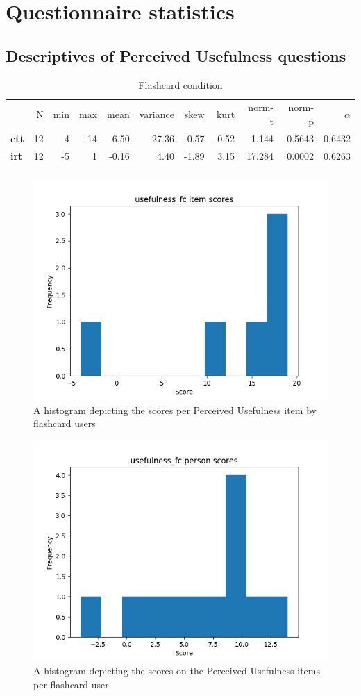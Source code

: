 \chapter{Questionnaire statistics}

\FloatBarrier
\section{Descriptives of Perceived Usefulness questions}

\begin{longtable}[c]{@{}lrrrrrrrrrr@{}}
\caption{Flashcard condition}
\endfirsthead
\endhead
\toprule\addlinespace
& N & min & max & mean & variance & skew & kurt & norm-t &
norm-p & $\alpha$
\\\addlinespace
\midrule
\textbf{ctt} & 12 & -4 & 14 & 6.50 & 27.36 & -0.57 & -0.52 & 1.144 &
0.5643 & 0.6432
\\\addlinespace
\textbf{irt} & 12 & -5 & 1 & -0.16 & 4.40 & -1.89 & 3.15 & 17.284 &
0.0002 & 0.6263
\\\addlinespace
\bottomrule
    \label{tab:usefulness_fc}
\end{longtable}

\begin{figure}
    \centering
    \includegraphics[width=.7\textwidth]{img/usefulness_fc_diff.png}
    \caption{A histogram depicting the scores per Perceived Usefulness item by flashcard users}
    \label{fig:usefulness_fc_diff}
\end{figure}
\begin{figure}
    \centering
    \includegraphics[width=.7\textwidth]{img/usefulness_fc_abil.png}
    \caption{A histogram depicting the scores on the Perceived Usefulness items per flashcard user}
    \label{fig:usefulness_fc_abil}
\end{figure}

